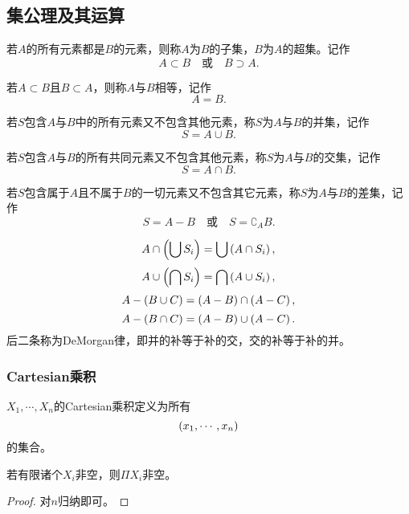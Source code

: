 \documentclass{ctexrep}
\begin{document}
  \subsection{集公理及其运算}
  \begin{definition}
    若$A$的所有元素都是$B$的元素，则称$A$为$B$的子集，$B$为$A$的超集。记作
    \[ A \subset B \quad \text{或} \quad B \supset A. \]
  \end{definition}
  \begin{definition}
    若$A \subset B$且$B\subset A$，则称$A$与$B$相等，记作
    \[ A=B. \]
  \end{definition}
  \begin{definition}
    若$S$包含$A$与$B$中的所有元素又不包含其他元素，称$S$为$A$与$B$的并集，记作
    \[ S = A \cup B. \]
  \end{definition}
  \begin{definition}
    若$S$包含$A$与$B$的所有共同元素又不包含其他元素，称$S$为$A$与$B$的交集，记作
    \[ S = A \cap B. \]
  \end{definition}
  \begin{definition}
    若$S$包含属于$A$且不属于$B$的一切元素又不包含其它元素，称$S$为$A$与$B$的差集，记作
    \[ S = A-B \quad \text{或} \quad S = \complement_A B. \]
  \end{definition}
  \begin{theorem}
    \[ A \cap \left(\bigcup S_i\right) = \bigcup \left(A \cap S_i\right), \]
    \[ A \cup \left(\bigcap S_i\right) = \bigcap \left(A \cup S_i\right), \]
    \[ A - \left(B \cup C\right) = \left(A-B\right) \cap \left(A-C\right), \]
    \[ A - \left(B \cap C\right) = \left(A-B\right) \cup \left(A-C\right). \]
    后二条称为DeMorgan律，即并的补等于补的交，交的补等于补的并。
  \end{theorem}
  \subsubsection{Cartesian乘积}
  \begin{definition}
    $X_1,\cdots,X_n$的Cartesian乘积定义为所有\ntuple 
    \[ \left(x_1,\cdots,x_n\right) \]
    的集合。
  \end{definition}
  \begin{lemma}[有限选择]
    若有限诸个$X_i$非空，则$\Pi X_i$非空。
  \end{lemma}
  \begin{proof}
    对$n$归纳即可。
  \end{proof}
\end{document}
